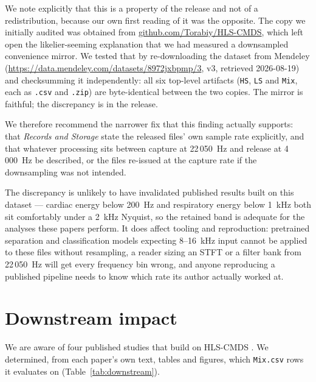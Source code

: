 \documentclass[11pt]{article}
\begin{document}
We note explicitly that this is a property of the release and not of a
redistribution, because our own first reading of it was the opposite. The
copy we initially audited was obtained from
\url{github.com/Torabiy/HLS-CMDS}, which left open the likelier-seeming
explanation that we had measured a downsampled convenience mirror. We tested
that by re-downloading the dataset from Mendeley
(\url{https://data.mendeley.com/datasets/8972jxbpmp/3}, v3, retrieved
2026-08-19) and checksumming it independently: all six top-level artifacts
(\texttt{HS}, \texttt{LS} and \texttt{Mix}, each as \texttt{.csv} and
\texttt{.zip}) are byte-identical between the two copies. The mirror is
faithful; the discrepancy is in the release.

We therefore recommend the narrower fix that this finding actually supports:
that \emph{Records and Storage} state the released files' own sample rate
explicitly, and that whatever processing sits between capture at 22\,050~Hz
and release at 4\,000~Hz be described, or the files re-issued at the capture
rate if the downsampling was not intended.

The discrepancy is unlikely to have invalidated published results built on
this dataset --- cardiac energy below 200~Hz and respiratory energy below
1~kHz both sit comfortably under a 2~kHz Nyquist, so the retained band is
adequate for the analyses these papers perform. It does affect tooling and
reproduction: pretrained separation and classification models expecting
8--16~kHz input cannot be applied to these files without resampling, a
reader sizing an STFT or a filter bank from 22\,050~Hz will get every
frequency bin wrong, and anyone reproducing a published pipeline needs to
know which rate its author actually worked at.

\section{Downstream impact}
\label{sec:impact}

We are aware of four published studies that build on HLS-CMDS
\cite{aidriven,spectrotemporal,nmfcrnn,edgelung}. We determined, from each
paper's own text, tables and figures, which \texttt{Mix.csv} rows it
evaluates on (Table~\ref{tab:downstream}).
\end{document}
